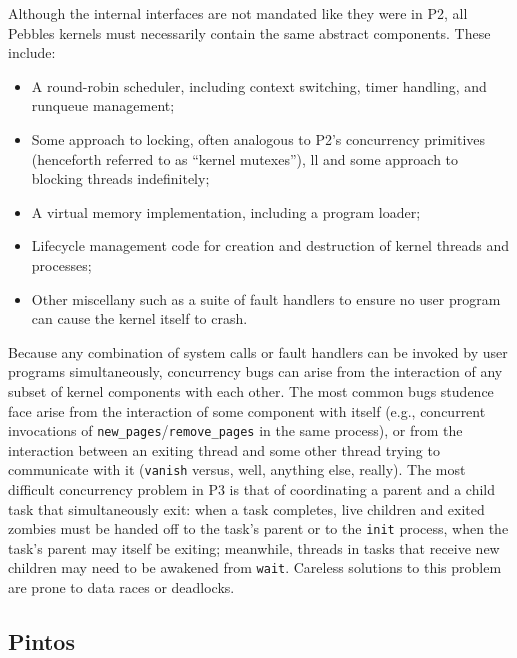Although the internal interfaces are not mandated like they were in P2, all Pebbles kernels must necessarily contain the same abstract components. These include:
\begin{itemize}
	\item A round-robin scheduler, including context switching, timer handling, and runqueue management;
	\item Some approach to locking, often analogous to P2's concurrency primitives (henceforth referred to as ``kernel mutexes''), 
	 ll       and some approach to blocking threads indefinitely;
	\item A virtual memory implementation, including a program loader;
	\item Lifecycle management code for creation and destruction of kernel threads and processes;
	\item Other miscellany such as a suite of fault handlers to ensure no user program can cause the kernel itself to crash.
\end{itemize}
Because any combination of system calls or fault handlers can be invoked by user programs simultaneously,
concurrency bugs can arise from the interaction of any subset of kernel components with each other.
The most common bugs studence face arise from the interaction of some component with itself (e.g., concurrent invocations of {\tt new\_pages}/{\tt remove\_pages} in the same process),
or from the interaction between an exiting thread and some other thread trying to communicate with it ({\tt vanish} versus, well, anything else, really).
The most difficult concurrency problem in P3 is that of coordinating a parent and a child task that simultaneously exit:
when a task completes, live children and exited zombies must be handed off to the task's parent or to the {\tt init} process,
when the task's parent may itself be exiting;
meanwhile, threads in tasks that receive new children may need to be awakened from {\tt wait}.
Careless solutions to this problem are prone to data races or deadlocks.


\subsection{Pintos}
\label{sec:overview-pintos}

